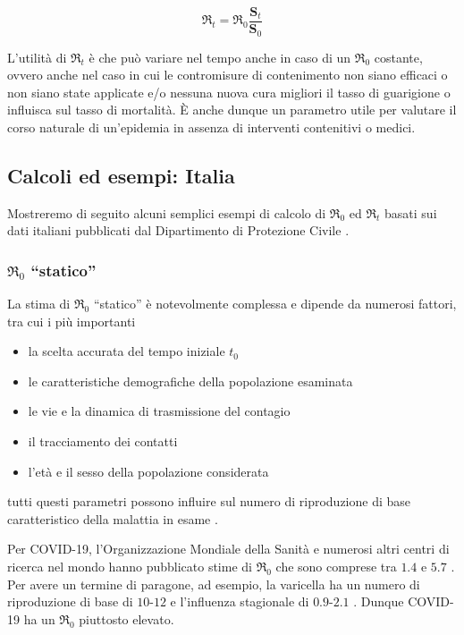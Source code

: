 \documentclass[11pt]{article}
\begin{document}
\[ \Re_t = \Re_0 \frac{\mathbf{S}_t}{\mathbf{S}_0} \]

L'utilità di \(\Re_t\) è che può variare nel tempo anche in caso di un
\(\Re_0\) costante, ovvero anche nel caso in cui le contromisure di
contenimento non siano efficaci o non siano state applicate e/o nessuna
nuova cura migliori il tasso di guarigione o influisca sul tasso di
mortalità. È anche dunque un parametro utile per valutare il corso
naturale di un'epidemia in assenza di interventi contenitivi o medici.

    \hypertarget{calcoli-ed-esempi-italia}{%
\subsection{Calcoli ed esempi: Italia}\label{calcoli-ed-esempi-italia}}

    Mostreremo di seguito alcuni semplici esempi di calcolo di \(\Re_0\) ed
\(\Re_t\) basati sui dati italiani pubblicati dal Dipartimento di
Protezione Civile \cite{pcm_dpc_2020}.

    \hypertarget{re_0-statico}{%
\subsubsection{\texorpdfstring{\(\Re_0\)
``statico''}{\textbackslash Re\_0 ``statico''}}\label{re_0-statico}}

    La stima di \(\Re_0\) ``statico'' è notevolmente complessa e dipende da
numerosi fattori, tra cui i più importanti

\begin{itemize}
\item
  la scelta accurata del tempo iniziale \(t_0\)
\item
  le caratteristiche demografiche della popolazione esaminata
\item
  le vie e la dinamica di trasmissione del contagio
\item
  il tracciamento dei contatti
\item
  l'età e il sesso della popolazione considerata
\end{itemize}

tutti questi parametri possono influire sul numero di riproduzione di
base caratteristico della malattia in esame
\cite{delamater_street_leslie_yang_jacobsen_2019} \cite{report_2020}.

Per COVID-19, l'Organizzazione Mondiale della Sanità e numerosi altri
centri di ricerca nel mondo hanno pubblicato stime di \(\Re_0\) che sono
comprese tra \(1.4\) e \(5.7\) \cite{report_2020}. Per avere un termine
di paragone, ad esempio, la varicella ha un numero di riproduzione di
base di \(10\)-\(12\) e l'influenza stagionale di \(0.9\)-\(2.1\)
\cite{wikipedia_2020}. Dunque COVID-19 ha un \(\Re_0\) piuttosto
elevato.
\end{document}
